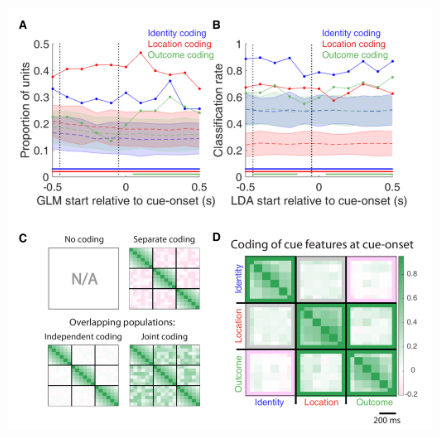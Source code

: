 \documentclass[11pt]{article}
\begin{document}
  \begin{figure}[ht!]
\centering
\includegraphics[height=0.5\textheight]{Fig 5 - Q1.pdf}

\end{figure}
\end{document}
